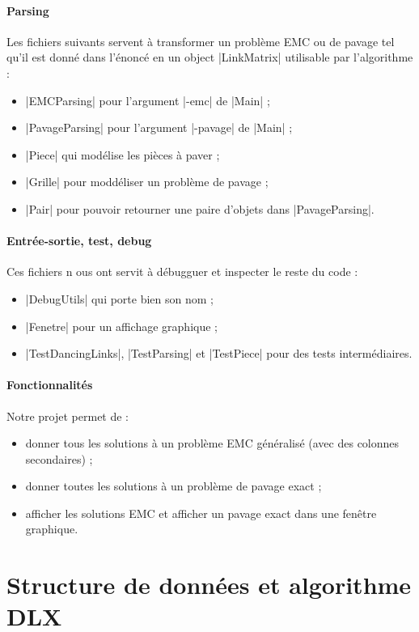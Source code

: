 \documentclass[11pt,french,a4paper]{article}
\begin{document}
\paragraph{Parsing} Les fichiers suivants servent à transformer un problème EMC ou de pavage tel qu'il est donné dans l'énoncé en un object |LinkMatrix| utilisable par l'algorithme :
\begin{itemize}
	\item |EMCParsing| pour l'argument |-emc| de |Main| ;
	\item |PavageParsing| pour l'argument |-pavage| de |Main| ;
	\item |Piece| qui modélise les pièces à paver ;
	\item |Grille| pour moddéliser un problème de pavage ;
	\item |Pair| pour pouvoir retourner une paire d'objets dans |PavageParsing|.
\end{itemize}

\paragraph{Entrée-sortie, test, debug} Ces fichiers n ous ont servit à débugguer et inspecter le reste du code :
\begin{itemize}
	\item |DebugUtils| qui porte bien son nom ;
	\item |Fenetre| pour un affichage graphique ;
	\item |TestDancingLinks|, |TestParsing| et |TestPiece| pour des tests intermédiaires.
\end{itemize}

\paragraph{Fonctionnalités} Notre projet permet de :
\begin{itemize}
	\item donner tous les solutions à un problème EMC généralisé (avec des colonnes secondaires) ;
	\item donner toutes les solutions à un problème de pavage exact ;
	\item afficher les solutions EMC et afficher un pavage exact dans une fenêtre graphique.
\end{itemize}


\section{Structure de données et algorithme DLX}
\end{document}
